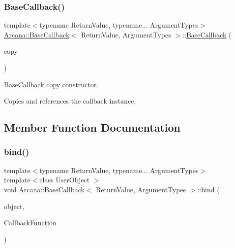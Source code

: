 \subsubsection{\texorpdfstring{Base\+Callback()}{BaseCallback()}\hspace{0.1cm}{\footnotesize\ttfamily [2/2]}}
{\footnotesize\ttfamily template$<$typename Return\+Value, typename... Argument\+Types$>$ \\
\mbox{\hyperlink{class_arcana_1_1_base_callback}{Arcana\+::\+Base\+Callback}}$<$ Return\+Value, Argument\+Types $>$\+::\mbox{\hyperlink{class_arcana_1_1_base_callback}{Base\+Callback}} (\begin{DoxyParamCaption}\item[{const \mbox{\hyperlink{class_arcana_1_1_base_callback}{Base\+Callback}}$<$ Return\+Value, Argument\+Types... $>$ \&}]{copy }\end{DoxyParamCaption})\hspace{0.3cm}{\ttfamily [inline]}}



\mbox{\hyperlink{class_arcana_1_1_base_callback}{Base\+Callback}} copy constructor. 

Copies and references the callback instance. 

\subsection{Member Function Documentation}
\mbox{\label{class_arcana_1_1_base_callback_af4de0a2c2e41f7e5e87d1e53ad6191d1}} 
\subsubsection{\texorpdfstring{bind()}{bind()}\hspace{0.1cm}{\footnotesize\ttfamily [1/2]}}
{\footnotesize\ttfamily template$<$typename Return\+Value, typename... Argument\+Types$>$ \\
template$<$class User\+Object $>$ \\
void \mbox{\hyperlink{class_arcana_1_1_base_callback}{Arcana\+::\+Base\+Callback}}$<$ Return\+Value, Argument\+Types $>$\+::bind (\begin{DoxyParamCaption}\item[{User\+Object $\ast$}]{object,  }\item[{Return\+Value(User\+Object\+::$\ast$)(Argument\+Types...)}]{Callback\+Function }\end{DoxyParamCaption})\hspace{0.3cm}{\ttfamily [inline]}}



